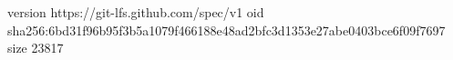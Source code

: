 version https://git-lfs.github.com/spec/v1
oid sha256:6bd31f96b95f3b5a1079f466188e48ad2bfc3d1353e27abe0403bce6f09f7697
size 23817
